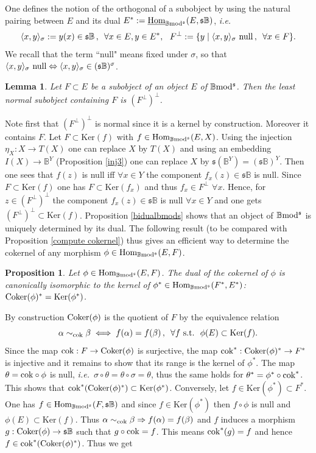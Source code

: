 \documentclass[12pt]{article}
\newtheorem{prop}[thm]{Proposition}
\newtheorem{lem}[thm]{Lemma}
\def\Hom{{\rm Hom}}
\def\Homi{{\underline{\rm Hom}}}
\def\Ker{{\rm Ker}}
\def\coker{{\rm Coker}}
\def\scoker{{\rm cok}}
\def\B{{\mathbb B}}
\def\qqq{\,,\,~\forall}
\newcommand{\ie}{{\it i.e.\/}\ }
\def\ker{{\mbox{Ker}}}
\def\Hom {{\mbox{Hom}}}
\def\yb{\mathfrak{s}}
\def\b2{{\rm \B mod^{\mathfrak s}}}
\begin{document}
 One defines the notion of the orthogonal of a subobject  by using the natural pairing between $E$ and its dual $E^*:=\Homi_\b2(E,\yb\B)$,  \ie
$$
\langle x,y\rangle_\sigma:=y(x)\in \yb\B\qqq x\in E,y\in E^*, \ \ F^\perp:=\{y\mid \langle x,y\rangle_\sigma \ {\rm null}\qqq x\in F\}.
$$ 
We recall that the term ``null" means fixed under $\sigma$, so that $\langle x,y\rangle_\sigma \ {\rm null}\Leftrightarrow \langle x,y\rangle_\sigma \in (\yb\B)^\sigma$.
  \begin{lem}\label{normal condition} Let $F\subset E$ be a subobject of an object $E$ of $\b2$. Then the least normal subobject containing $F$ is $(F^\perp)^\perp$.
    \end{lem}
\proof Note first that $(F^\perp)^\perp$ is normal since it is a kernel by construction. Moreover it contains $F$. Let $F\subset \ker(f)$ with $f\in \Hom_\b2(E,X)$. Using the injection $\eta_X:X\to T(X)$ one can replace $X$ by $T(X)$ and using an embedding $I(X)\to \B^Y$ (Proposition \ref{inj3}) one can replace $X$ by $\yb(\B^Y)=(\yb\B)^Y$. Then one sees that $f(z)$ is null iff  $\forall x\in Y$ the component $f_x(z)\in \yb\B$ is null. Since $F\subset \ker(f)$ one has $F\subset \ker(f_x)$ and thus $f_x\in F^\perp$ $\forall x$. Hence, for $z \in (F^\perp)^\perp$ the component $f_x(z)\in \yb\B$ is null $\forall x\in Y$ and one gets  $(F^\perp)^\perp\subset \ker(f)$. \endproof 
Proposition \ref{bidualbmods} shows that an object of $\b2$ is uniquely determined by its dual. The following result (to be compared with Proposition \ref{compute cokernel}) thus gives an efficient way to determine the cokernel of any morphism $\phi\in \Hom_\b2(E,F)$.
\begin{prop}\label{bidualcoker} Let $\phi\in \Hom_\b2(E,F)$. The dual of the cokernel of $\phi$ is canonically isomorphic to the kernel of $\phi^*\in \Hom_\b2(F^*,E^*)$:~ $\coker(\phi)^*=\Ker(\phi^*)$.
 \end{prop}
 \proof By construction  $\coker(\phi)$ is the quotient of $F$ by the equivalence relation
 $$
 \alpha \sim_\scoker \beta\iff f(\alpha)=f(\beta)\qqq f~{\rm s.t.}~ \ \phi(E)\subset \ker(f).
  $$ 
  Since the map $\scoker: F\to \coker(\phi)$ is surjective, the map $\scoker^*:  \coker(\phi)^*\to F^*$ is injective and it remains to show that its range is the kernel of $\phi^*$. The map $\theta=\scoker\circ \phi$ is null, \ie $\sigma\circ\theta=\theta \circ \sigma=\theta$, thus the same holds for $\theta^*=\phi^*\circ \scoker^*$.  This shows that   $\scoker^*(\coker(\phi)^*)\subset \ker(\phi^*)$. Conversely, let $f\in \ker(\phi^*)\subset F^*$. One has $f\in \Hom_\b2(F,\yb\B)$ and since $f\in \ker(\phi^*)$ then $f\circ \phi$ is null and $\phi(E)\subset \ker(f)$. Thus $\alpha \sim_\scoker \beta\Rightarrow  f(\alpha)=f(\beta)$ and $f$ induces a morphism $g: \coker(\phi)\to  \yb\B$ such that $g\circ \scoker =f$. This means  $\scoker^*(g)=f$ and hence  $f\in \scoker^*(\coker(\phi)^*)$. Thus we get  
\end{document}
